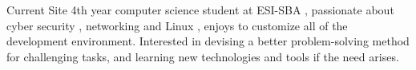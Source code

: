 

\begin{cvparagraph}

Current Site 4th year computer science student at ESI-SBA , passionate about cyber security , networking and Linux , enjoys to customize all of the development environment. Interested in devising a better problem-solving method for challenging tasks, and learning new technologies and tools if the need arises.
\end{cvparagraph}
